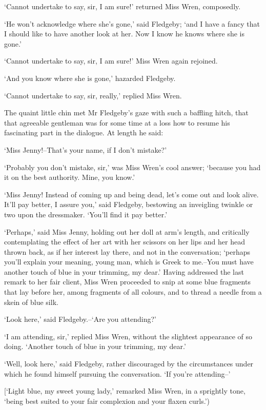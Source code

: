 ‘Cannot undertake to say, sir, I am sure!’ returned Miss Wren,
composedly.

‘He won’t acknowledge where she’s gone,’ said Fledgeby; ‘and I have
a fancy that I should like to have another look at her. Now I know he
knows where she is gone.’

‘Cannot undertake to say, sir, I am sure!’ Miss Wren again rejoined.

‘And you know where she is gone,’ hazarded Fledgeby.

‘Cannot undertake to say, sir, really,’ replied Miss Wren.

The quaint little chin met Mr Fledgeby’s gaze with such a baffling
hitch, that that agreeable gentleman was for some time at a loss how to
resume his fascinating part in the dialogue. At length he said:

‘Miss Jenny!--That’s your name, if I don’t mistake?’

‘Probably you don’t mistake, sir,’ was Miss Wren’s cool answer; ‘because
you had it on the best authority. Mine, you know.’

‘Miss Jenny! Instead of coming up and being dead, let’s come out and
look alive. It’ll pay better, I assure you,’ said Fledgeby, bestowing
an inveigling twinkle or two upon the dressmaker. ‘You’ll find it pay
better.’

‘Perhaps,’ said Miss Jenny, holding out her doll at arm’s length, and
critically contemplating the effect of her art with her scissors on her
lips and her head thrown back, as if her interest lay there, and not in
the conversation; ‘perhaps you’ll explain your meaning, young man, which
is Greek to me.--You must have another touch of blue in your trimming,
my dear.’ Having addressed the last remark to her fair client, Miss
Wren proceeded to snip at some blue fragments that lay before her, among
fragments of all colours, and to thread a needle from a skein of blue
silk.

‘Look here,’ said Fledgeby.--‘Are you attending?’

‘I am attending, sir,’ replied Miss Wren, without the slightest
appearance of so doing. ‘Another touch of blue in your trimming, my
dear.’

‘Well, look here,’ said Fledgeby, rather discouraged by the
circumstances under which he found himself pursuing the conversation.
‘If you’re attending--’

[‘Light blue, my sweet young lady,’ remarked Miss Wren, in a sprightly
tone, ‘being best suited to your fair complexion and your flaxen
curls.’)

